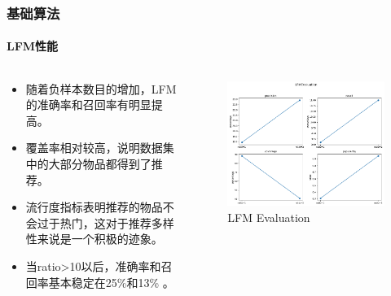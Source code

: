 \documentclass{beamer}
\begin{document}
	\begin{frame}
	\frametitle{{基础算法}}
	\framesubtitle{LFM性能}
		\begin{columns}
			\begin{column}{0.5\textwidth}
				\begin{itemize}
					\item 随着负样本数目的增加，LFM的准确率和召回率有明显提高。
					\item 覆盖率相对较高，说明数据集中的大部分物品都得到了推荐。
					\item 流行度指标表明推荐的物品不会过于热门，这对于推荐多样性来说是一个积极的迹象。
					\item 当ratio>10以后，准确率和召回率基本稳定在25\%和13\% 。
				\end{itemize}
			\end{column}
			\begin{column}{0.5\textwidth}
				\begin{figure}
        		\includegraphics[width=\linewidth]{fig/myplot.png} %
        		\caption{LFM Evaluation}
      			\end{figure}
			\end{column}
		\end{columns}
	\end{frame}
\end{document}
